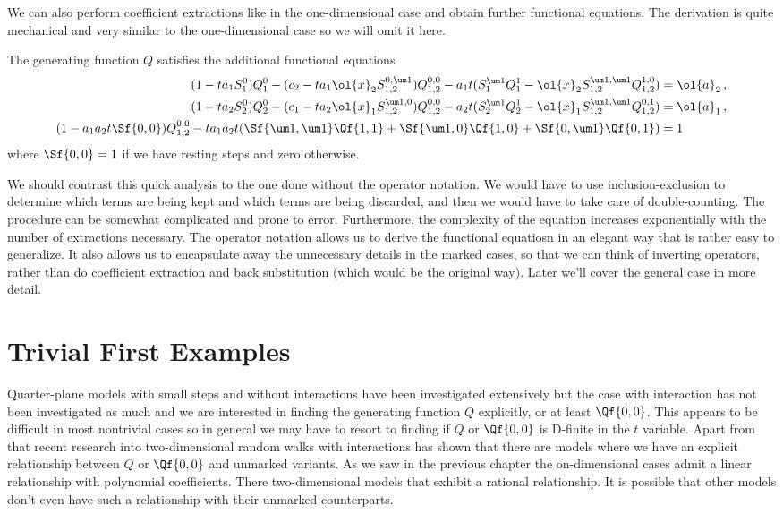 We can also perform coefficient extractions like in the one-dimensional case and obtain further functional equations. The derivation is quite mechanical and very similar to the one-dimensional case so we will omit it here.
\begin{corollary} The generating function $Q$ satisfies the additional functional equations
\begin{align*}
(1-ta_1 S_1^0)Q_1^0 - (c_2-ta_1\ol{x}_2S_{1,2}^{0,\um 1})Q_{1,2}^{0,0} - a_1 t(S_1^{\um 1}Q_1^1-\ol{x}_2S_{1,2}^{\um 1,\um 1}Q_{1,2}^{1,0}) &=\ol{a}_2\,,\\
(1-ta_2 S_2^0)Q_2^0 - (c_1-ta_2\ol{x}_1S_{1,2}^{\um 1,0})Q_{1,2}^{0,0} -a_2t(S_2^{\um 1}Q_2^1-\ol{x}_1S_{1,2}^{\um 1,\um 1}Q_{1,2}^{0,1}) &=\ol{a}_1\,,\\
(1-a_1 a_2 t \Sf{0,0})Q_{1,2}^{0,0} - ta_1a_2t(\Sf{\um 1,\um 1}\Qf{1,1}+\Sf{\um 1,0}\Qf{1,0}+\Sf{0,\um 1}\Qf{0,1})&= 1
\end{align*}
where $\Sf{0,0} = 1$ if we have resting steps and zero otherwise.
\end{corollary}

We should contrast this quick analysis to the one done without the operator notation. We would have to use inclusion-exclusion to determine which terms are being kept and which terms are being discarded, and then we would have to take care of double-counting. The procedure can be somewhat complicated and prone to error. Furthermore, the complexity of the equation increases exponentially with the number of extractions necessary. The operator notation allows us to derive the functional equatiosn in an elegant way that is rather easy to generalize. It also allows us to encapsulate away the unnecessary details in the marked cases, so that we can think of inverting operators, rather than do coefficient extraction and back substitution (which would be the original way). Later we'll cover the general case in more detail.

\section{Trivial First Examples}

Quarter-plane models with small steps and without interactions have been investigated extensively but the case with interaction has not been investigated as much and we are interested in finding the generating function $Q$ explicitly, or at least $\Qf{0,0}$. This appears to be difficult in most nontrivial cases so in general we may have to resort to finding if $Q$ or $\Qf{0,0}$ is D-finite in the $t$ variable. Apart from that recent research into two-dimensional random walks with interactions has shown that there are models where we have an explicit relationship between $Q$ or $\Qf{0,0}$ and unmarked variants. As we saw in the previous chapter the on-dimensional cases admit a linear relationship with polynomial coefficients. There two-dimensional models that exhibit a rational relationship. It is possible that other models don't even have such a relationship with their unmarked counterparts.

